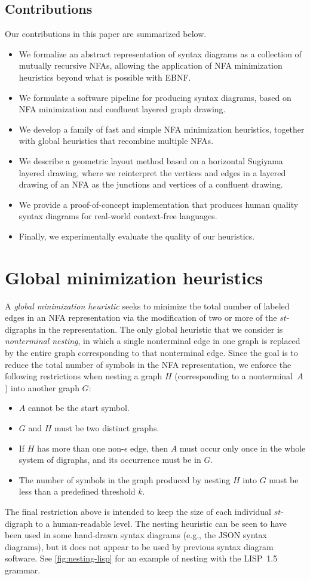 \documentclass[10pt]{llncs}
\begin{document}
\subsection{Contributions}
Our contributions in this paper are summarized below.
\begin{itemize}
\item We formalize an abstract representation of syntax diagrams as a collection of mutually recursive NFAs, allowing the application of NFA minimization heuristics beyond what is possible with EBNF.
\item We formulate a software pipeline for producing syntax diagrams, based on NFA minimization and confluent layered graph drawing.
\item We develop a family of fast and simple NFA minimization heuristics, together with global heuristics that recombine multiple NFAs.
\item We describe a geometric layout method based on a horizontal Sugiyama layered drawing, where we reinterpret the vertices and edges in a layered drawing of an NFA as the junctions and vertices of a confluent drawing.
\item We provide a proof-of-concept implementation that produces human quality syntax diagrams for real-world context-free languages.
\item Finally, we experimentally evaluate the quality of our heuristics.
\end{itemize}

\section{Global minimization heuristics}
A \emph{global minimization heuristic} seeks to minimize the total number of labeled edges in an NFA representation via the modification of two or more of the $st$-digraphs in the representation. The only global heuristic that we consider is \emph{nonterminal nesting}, in which a single nonterminal edge in one graph is replaced by the entire graph corresponding to that nonterminal edge. Since the goal is to reduce the total number of symbols in the NFA representation, we enforce the following restrictions when nesting a graph $H$ (corresponding to a nonterminal~$A$) into another graph $G$:
\begin{itemize}
\item $A$ cannot be the start symbol.
\item $G$ and $H$ must be two distinct graphs.
\item If $H$ has more than one non-$\epsilon$ edge, then $A$ must occur only once in the whole system of digraphs, and its occurrence must be in $G$.
\item The number of symbols in the  graph produced by nesting $H$ into $G$ must be less than a predefined threshold $k$.
\end{itemize}
The final restriction above is intended to keep the size of each individual $st$-digraph to a human-readable level. The nesting heuristic can be seen to have been used in some hand-drawn syntax diagrams (e.g., the JSON syntax diagrams), but it does not appear to be used by previous syntax diagram software. See \autoref{fig:nesting-lisp} for an example of nesting with the LISP~1.5 grammar.
\end{document}
